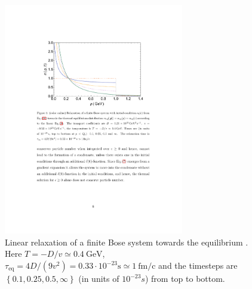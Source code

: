 \begin{figure}[t]
\centering
\includegraphics[width = 0.7\textwidth]{figures/rta}
\caption{Linear relaxation of a finite Bose system towards the equilibrium \cite{Wolschin2018}. \\ Here $T = -D/v \simeq 0.4\ \mathrm{GeV}$, $\tau_{\mathrm{eq}} = 4D/(9v^2) = 0.33\cdot 10^{-23} \mathrm{s} \simeq 1\ \mathrm{fm/c}$ and the timesteps are $\left\{0.1, 0.25, 0.5,\infty\right\}$ (in units of $10^{-23}s$) from top to bottom.} 
\label{fig:rta1}
\end{figure}


